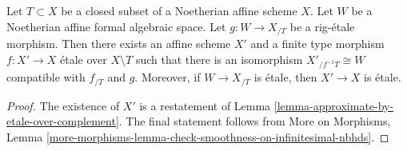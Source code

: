 \begin{lemma}
\label{lemma-algebraize-rig-etale-affine}
Let $T \subset X$ be a closed subset of a Noetherian affine scheme $X$.
Let $W$ be a Noetherian affine formal algebraic space.
Let $g : W \to X_{/T}$ be a rig-\'etale morphism. Then there exists
an affine scheme $X'$ and a finite type morphism $f : X' \to X$
\'etale over $X \setminus T$ such that there is an isomorphism
$X'_{/f^{-1}T} \cong W$ compatible with $f_{/T}$ and $g$.
Moreover, if $W \to X_{/T}$ is \'etale, then $X' \to X$ is \'etale.
\end{lemma}

\begin{proof}
The existence of $X'$ is a restatement of
Lemma \ref{lemma-approximate-by-etale-over-complement}.
The final statement follows from
More on Morphisms, Lemma
\ref{more-morphisms-lemma-check-smoothness-on-infinitesimal-nbhds}.
\end{proof}
